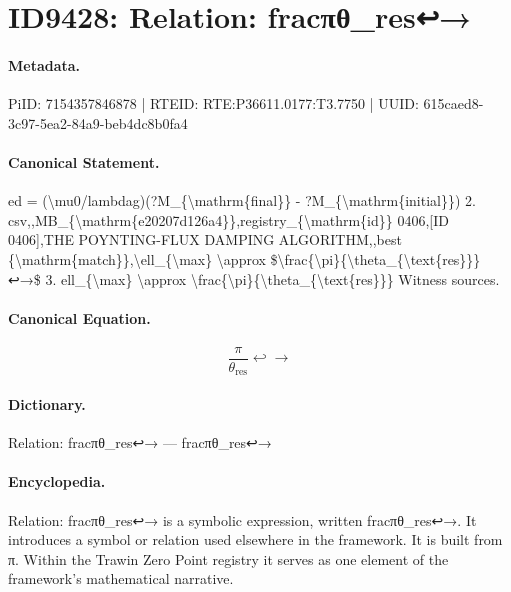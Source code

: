 \section*{ID9428: Relation: fracπθ\_res↩→}
\paragraph{Metadata.}
PiID: 7154357846878 | RTEID: RTE:P36611.0177:T3.7750 | UUID: 615caed8-3c97-5ea2-84a9-beb4dc8b0fa4

\paragraph{Canonical Statement.}
ed = (\textbackslash{}mu0/lambdag)(?M\_\{\textbackslash{}mathrm\{final\}\} - ?M\_\{\textbackslash{}mathrm\{initial\}\}) 2. csv,,MB\_\{\textbackslash{}mathrm\{e20207d126a4\}\},registry\_\{\textbackslash{}mathrm\{id\}\} 0406,[ID 0406],THE POYNTING-FLUX DAMPING ALGORITHM,,best \{\textbackslash{}mathrm\{match\}\},\textbackslash{}ell\_\{\textbackslash{}max\} \textbackslash{}approx \$\textbackslash{}frac\{\textbackslash{}pi\}\{\textbackslash{}theta\_\{\textbackslash{}text\{res\}\}\}↩→\$ 3. ell\_\{\textbackslash{}max\} \textbackslash{}approx \textbackslash{}frac\{\textbackslash{}pi\}\{\textbackslash{}theta\_\{\textbackslash{}text\{res\}\}\} Witness sources.

\paragraph{Canonical Equation.}
\[
\frac{\pi}{\theta_{\text{res}}}↩→
\]

\paragraph{Dictionary.}
Relation: fracπθ\_res↩→ — fracπθ\_res↩→

\paragraph{Encyclopedia.}
Relation: fracπθ\_res↩→ is a symbolic expression, written fracπθ\_res↩→. It introduces a symbol or relation used elsewhere in the framework. It is built from π. Within the Trawin Zero Point registry it serves as one element of the framework's mathematical narrative.
